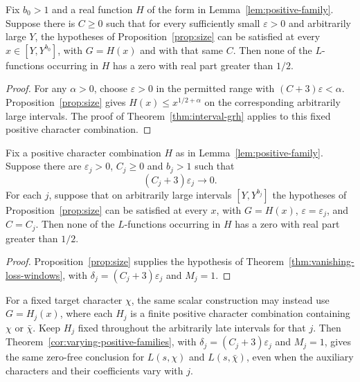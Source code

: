 \begin{corollary}\label{cor:scalar-construction}
Fix $b_0>1$ and a real function $H$ of the form in
Lemma~\ref{lem:positive-family}. Suppose there is $C\ge0$ such that
for every sufficiently small $\varepsilon>0$ and arbitrarily large
$Y$, the hypotheses of Proposition~\ref{prop:size} can be satisfied
at every $x\in[Y,Y^{b_0}]$, with $G=H(x)$ and with that same $C$.
Then none of the $L$-functions occurring in $H$ has a zero with
real part greater than $1/2$.
\end{corollary}

\begin{proof}
For any $\alpha>0$, choose $\varepsilon>0$ in the permitted range
with $(C+3)\varepsilon<\alpha$. Proposition~\ref{prop:size} gives
$H(x)\le x^{1/2+\alpha}$ on the corresponding arbitrarily large
intervals. The proof of Theorem~\ref{thm:interval-grh} applies to
this fixed positive character combination.
\end{proof}

\begin{corollary}\label{cor:variable-loss-construction}
Fix a positive character combination $H$ as in
Lemma~\ref{lem:positive-family}. Suppose there are
$\varepsilon_j>0$, $C_j\ge0$ and $b_j>1$ such that
\[
                    (C_j+3)\varepsilon_j\longrightarrow0.
\]
For each $j$, suppose that on arbitrarily large intervals
$[Y,Y^{b_j}]$ the hypotheses of Proposition~\ref{prop:size}
can be satisfied at every $x$, with $G=H(x)$,
$\varepsilon=\varepsilon_j$, and $C=C_j$.
Then none of the $L$-functions occurring in $H$ has a zero with
real part greater than $1/2$.
\end{corollary}

\begin{proof}
Proposition~\ref{prop:size} supplies the hypothesis of
Theorem~\ref{thm:vanishing-loss-windows}, with
$\delta_j=(C_j+3)\varepsilon_j$ and \mbox{$M_j=1$}.
\end{proof}

For a fixed target character $\chi$, the same scalar construction may
instead use $G=H_j(x)$, where each $H_j$ is a finite positive character
combination containing $\chi$ or $\bar\chi$. Keep $H_j$ fixed throughout
the arbitrarily late intervals for that $j$. Then
Theorem~\ref{cor:varying-positive-families}, with
$\delta_j=(C_j+3)\varepsilon_j$ and \mbox{$M_j=1$}, gives the same zero-free
conclusion for $L(s,\chi)$ and $L(s,\bar\chi)$, even when the auxiliary
characters and their coefficients vary with $j$.


